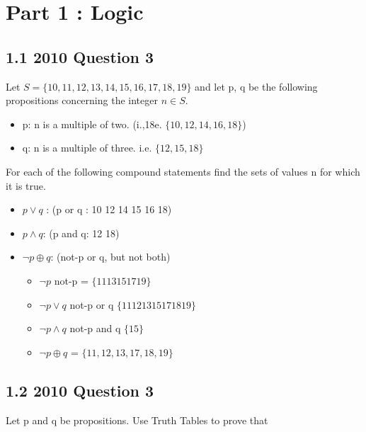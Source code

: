 \documentclass[]{report}
\begin{document}
\section*{Part 1 : Logic}


\subsection*{1.1 2010 Question 3}
Let $S = \{10,11,12,13,14,15,16,17,18,19\}$ and let p, q be the following propositions concerning the integer $n \in S$.

\begin{itemize}
\item p: n is a multiple of two. (i.,18e. $\{10,12,14,16,18\}$)
\item q: n is a multiple of three. {i.e. $\{12,15,18\}$}
\end{itemize}

For each of the following compound statements find the sets of values n for which it is true. 

\begin{itemize}
\item $p \vee q$ : (p or q :  10 12 14 15 16 18) 
\item $p \wedge q$: (p and q: 12 18)
\item $ \neg p \oplus q$: (not-p or q, but not both)
\begin{itemize}
\item $\neg p $ not-p = $\{ 11 13 15 17 19\}$
\item $\neg p \vee q$ not-p or q $\{11 12 13 15 17 18 19\}$
\item $\neg p \wedge q$ not-p and q $\{15\} $
\item $ \neg p \oplus q$ = $\{11, 12, 13, 17, 18, 19\}$
\end{itemize}
\end{itemize}


\subsection*{1.2 2010 Question 3}

Let p and q be propositions. Use Truth Tables to prove that
\end{document}

